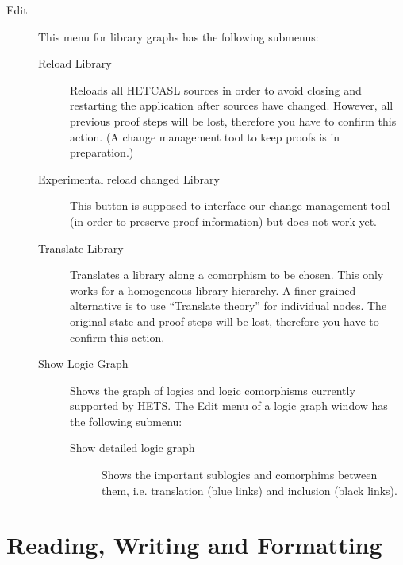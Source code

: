 \documentclass{article}
\newcommand{\normalTEXTSC}[2]{{#1\scriptsize#2}}
\newcommand     {\Hets}{\normalTEXTSC{H}{ETS}\xspace}
\newcommand{\HetCASL}{\normalTEXTSC{H}{ET}\normalTEXTSC{C}{ASL}\xspace}
\begin{document}
\begin{description}
\item[Edit] This menu for library graphs has the following submenus:
\begin{description}
\item[Reload Library] Reloads all \HetCASL sources in order to avoid closing
  and restarting the application after sources have changed. However, all
  previous proof steps will be lost, therefore you have to confirm this
  action. (A change management tool to keep proofs is in preparation.)
\item[Experimental reload changed Library] This button is supposed to
  interface our change management tool (in order to preserve proof
  information) but does not work yet.
\item[Translate Library] Translates a library along a comorphism to be chosen.
  This only works for a homogeneous library hierarchy. A finer grained
  alternative is to use ``Translate theory'' for individual nodes. The
  original state and proof steps will be lost, therefore you have to confirm
  this action.
\item[Show Logic Graph] Shows the graph of logics and logic comorphisms
  currently supported by \Hets. The Edit menu of a logic graph window has the
  following submenu:
\begin{description}
\item[Show detailed logic graph] Shows the important sublogics and comorphims
  between them, i.e. translation (blue links) and inclusion (black links).
\end{description}
\end{description}
\end{description}


\section{Reading, Writing and Formatting}
\end{document}
